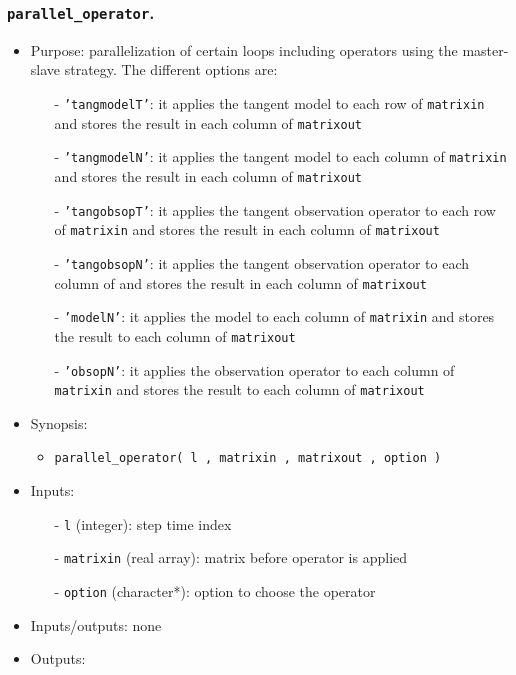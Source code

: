 \documentclass[12pt]{article}
\begin{document}
\subsubsection{{\tt parallel\_operator}.}
\begin{itemize}
\item Purpose: parallelization of certain loops including operators using the master-slave strategy. The different options are:
\begin{itemize}
\item[-] {\tt 'tangmodelT'}: it applies the tangent model to each row of {\tt matrixin} and stores the result in each column of {\tt matrixout}
\item[-] {\tt 'tangmodelN'}: it applies the tangent model to each column of {\tt matrixin} and stores the result in each column of {\tt matrixout}
\item[-] {\tt 'tangobsopT'}: it applies the tangent observation operator to each row of {\tt matrixin} and stores the result in each column of {\tt matrixout}
\item[-] {\tt 'tangobsopN'}: it applies the tangent observation operator to each column of  and stores the result in each column of {\tt matrixout}
\item[-] {\tt 'modelN'}: it applies the model to each column of {\tt matrixin} and stores the result to each column of {\tt matrixout}
\item[-] {\tt 'obsopN'}: it applies the observation operator to each column of {\tt matrixin} and stores the result to each column of {\tt matrixout}
\end{itemize}
\item Synopsis: 
\begin{itemize}
\item {\tt parallel\_operator( l , matrixin , matrixout , option )}
\end{itemize}
\item Inputs: 
\begin{itemize}
\item[-] {\tt l} (integer): step time index
\item[-] {\tt matrixin} (real array): matrix before operator is applied
\item[-] {\tt option} (character*): option to choose the operator
\end{itemize}
\item Inputs/outputs: none
\item Outputs: 
\begin{itemize}

\end{itemize}
\end{itemize}
\end{document}
